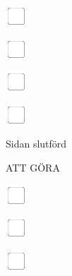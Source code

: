 \documentclass[11pt,titlepage]{article}
\begin{document}
\vspace{10mm}

\noindent
\includegraphics[]{checkbox-4mm.pdf}

\vspace{10mm}

\noindent
\includegraphics[]{checkbox-4mm.pdf}

\vspace{10mm}

\noindent
\includegraphics[]{checkbox-4mm.pdf}

\vspace{10mm}

\noindent
\includegraphics[]{checkbox-4mm.pdf}

\vspace{4mm}

\hfill Sidan slutförd \hspace{20mm}

\pagebreak

\small
\hfill ATT GÖRA

\vspace{6mm}

\noindent
\includegraphics[]{checkbox-4mm.pdf}

\vspace{10mm}

\noindent
\includegraphics[]{checkbox-4mm.pdf}

\vspace{10mm}

\noindent
\includegraphics[]{checkbox-4mm.pdf}
\end{document}
